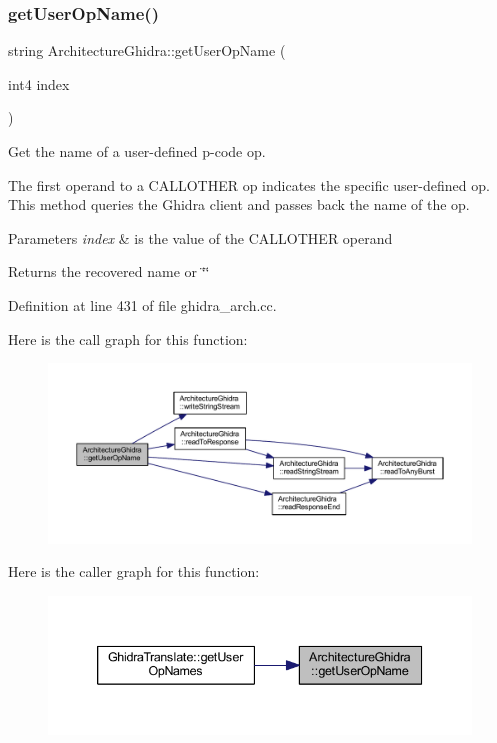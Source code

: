 \subsubsection{\texorpdfstring{getUserOpName()}{getUserOpName()}}
{\footnotesize\ttfamily string Architecture\+Ghidra\+::get\+User\+Op\+Name (\begin{DoxyParamCaption}\item[{int4}]{index }\end{DoxyParamCaption})}



Get the name of a user-\/defined p-\/code op. 

The first operand to a C\+A\+L\+L\+O\+T\+H\+ER op indicates the specific user-\/defined op. This method queries the Ghidra client and passes back the name of the op. 
\begin{DoxyParams}{Parameters}
{\em index} & is the value of the C\+A\+L\+L\+O\+T\+H\+ER operand \\
\hline
\end{DoxyParams}
\begin{DoxyReturn}{Returns}
the recovered name or \char`\"{}\char`\"{} 
\end{DoxyReturn}


Definition at line 431 of file ghidra\+\_\+arch.\+cc.

Here is the call graph for this function\+:
\nopagebreak
\begin{figure}[H]
\begin{center}
\leavevmode
\includegraphics[width=350pt]{class_architecture_ghidra_a743c6158bb0075ab7c13d15725d13414_cgraph}
\end{center}
\end{figure}
Here is the caller graph for this function\+:
\nopagebreak
\begin{figure}[H]
\begin{center}
\leavevmode
\includegraphics[width=339pt]{class_architecture_ghidra_a743c6158bb0075ab7c13d15725d13414_icgraph}
\end{center}
\end{figure}
\mbox{\label{class_architecture_ghidra_a0b42cdf80b24e206fe2022b5937daa42}} 
